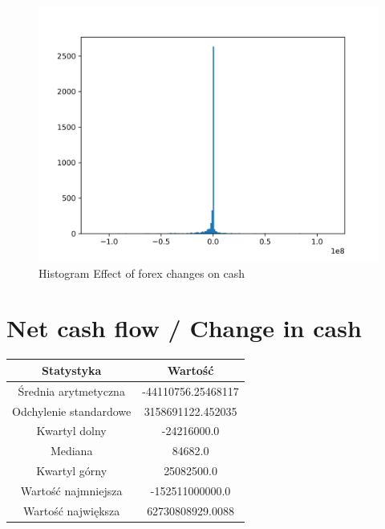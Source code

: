 \documentclass{article}
\begin{document}
\begin{figure}[h!]
    \includegraphics[width=\linewidth]{variables/Effect of forex changes on cash.png}
    \caption{Histogram Effect of forex changes on cash }
\end{figure}\section{ Net cash flow / Change in cash }

\begin{center}
    \begin{tabular}{|c | c|} 
    \hline
    Statystyka & Wartość \\
    \hline\hline
    Średnia arytmetyczna & -44110756.25468117 \\ 
    \hline
    Odchylenie standardowe & 3158691122.452035 \\
    \hline
    Kwartyl dolny & -24216000.0 \\
    \hline
    Mediana & 84682.0 \\
    \hline
    Kwartyl górny & 25082500.0 \\
    \hline
    Wartość najmniejsza & -152511000000.0 \\
    \hline
    Wartość największa & 62730808929.0088 \\
    \hline
   \end{tabular}
\end{center}
\end{document}
